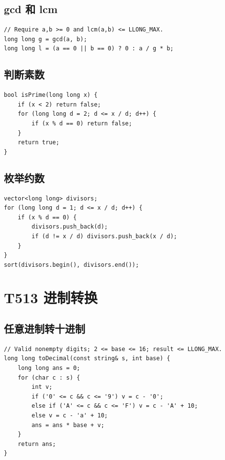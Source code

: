\subsection{gcd 和 lcm}

\begin{lstlisting}
// Require a,b >= 0 and lcm(a,b) <= LLONG_MAX.
long long g = gcd(a, b);
long long l = (a == 0 || b == 0) ? 0 : a / g * b;
\end{lstlisting}

\subsection{判断素数}

\begin{lstlisting}
bool isPrime(long long x) {
    if (x < 2) return false;
    for (long long d = 2; d <= x / d; d++) {
        if (x % d == 0) return false;
    }
    return true;
}
\end{lstlisting}

\subsection{枚举约数}

\begin{lstlisting}
vector<long long> divisors;
for (long long d = 1; d <= x / d; d++) {
    if (x % d == 0) {
        divisors.push_back(d);
        if (d != x / d) divisors.push_back(x / d);
    }
}
sort(divisors.begin(), divisors.end());
\end{lstlisting}

\section{T513 进制转换}\label{sec:09-38}\label{tpl:513}

\subsection{任意进制转十进制}

\begin{lstlisting}
// Valid nonempty digits; 2 <= base <= 16; result <= LLONG_MAX.
long long toDecimal(const string& s, int base) {
    long long ans = 0;
    for (char c : s) {
        int v;
        if ('0' <= c && c <= '9') v = c - '0';
        else if ('A' <= c && c <= 'F') v = c - 'A' + 10;
        else v = c - 'a' + 10;
        ans = ans * base + v;
    }
    return ans;
}
\end{lstlisting}

